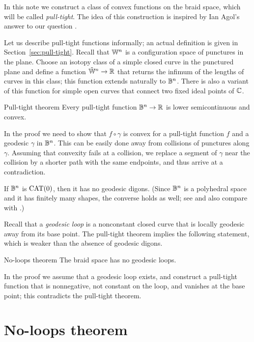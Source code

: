 \documentclass[a4paper,10pt]{article}
\begin{document}
In this note we construct a class of convex functions on the braid space, which will be called \emph{pull-tight}.
The idea of this construction is inspired by Ian Agol's answer to our question \cite{agol}.

Let us describe pull-tight functions informally; an actual definition is given in Section~\ref{sec:pull-tight}.
Recall that $\mathbb{W}^n$ is a configuration space of punctures in the plane.
Choose an isotopy class of a simple closed curve in the punctured plane and define a function $\tilde {\mathbb{W}}^n\to\mathbb{R}$ that returns the infimum of the lengths of curves in this class;
this function extends naturally to $\mathbb{B}^n$.
There is also a variant of this function for simple open curves that connect two fixed ideal points of $\mathbb{C}$.

\begin{thm}{Pull-tight theorem}\label{thm:pull-tight}
Every pull-tight function $\mathbb{B}^n\to\mathbb{R}$ is lower semicontinuous and convex.
\end{thm}

In the proof we need to show that $f\circ\gamma$ is convex for a pull-tight function $f$ and a geodesic $\gamma$ in $\mathbb{B}^n$.
This can be easily done away from collisions of punctures along $\gamma$.
Assuming that convexity fails at a collision, we replace a segment of $\gamma$ near the collision by a shorter path with the same endpoints, and thus arrive at a contradiction.

\medskip

If $\mathbb{B}^n$ is $\operatorname{\rm CAT}(0)$, then it has no geodesic digons.
(Since $\mathbb{B}^n$ is a polyhedral space and it has finitely many shapes, the converse holds as well; see \cite[II.5.4]{bridson-haefliger} and also compare with \cite[6.6]{AKP-invitation}.)

Recall that a \emph{geodesic loop} is a nonconstant closed curve that is locally geodesic away from its base point.
The pull-tight theorem implies the following statement, which is weaker than the absence of geodesic digons.

\begin{thm}{No-loops theorem}\label{thm:no-loops}
The braid space has no geodesic loops.
\end{thm}

In the proof we assume that a geodesic loop exists, and construct a pull-tight function that is nonnegative, not constant on the loop, and vanishes at the base point; this contradicts the pull-tight theorem.


\section{No-loops theorem}
\end{document}
